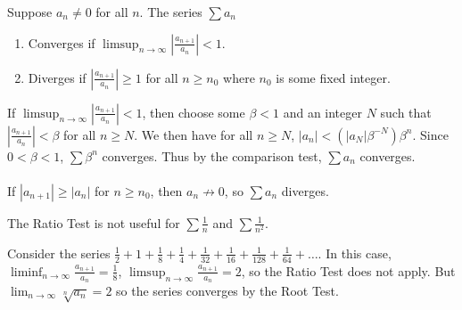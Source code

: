 \documentclass{jacky}
\begin{document}
\begin{thm}
  Suppose $a_n\neq0$ for all $n$. The series $\sum a_n$
  \begin{enumerate}
    \item Converges if $\limsup_{n\to\infty}|\frac{a_{n+1}}{a_n}|<1$.
    \item Diverges if $|\frac{a_{n+1}}{a_n}|\ge1$ for all $n\ge n_0$ where
      $n_0$ is some fixed integer.
  \end{enumerate}
\end{thm}

\begin{pf}
  If $\limsup_{n\to\infty}|\frac{a_{n+1}}{a_n}|<1$, then choose some $\beta<1$
  and an integer $N$ such that $|\frac{a_{n+1}}{a_n}|<\beta$ for all $n\ge N$.
  We then have for all $n\ge N$, $|a_n|<(|a_N|\beta^{-N})\beta^n$. Since
  $0<\beta<1$, $\sum\beta^n$ converges. Thus by the comparison test, $\sum a_n$
  converges.\\\\
  If $|a_{n+1}|\ge|a_n|$ for $n\ge n_0$, then $a_n\not\to0$, so $\sum a_n$
  diverges.
\end{pf}

\begin{note}
  The Ratio Test is not useful for $\sum\frac{1}{n}$ and $\sum\frac{1}{n^2}$.
\end{note}

\begin{ex}
  Consider the series $\frac{1}{2}+1+\frac{1}{8}+\frac{1}{4}+\frac{1}{32}
  +\frac{1}{16}+\frac{1}{128}+\frac{1}{64}+\ldots$. In this case,
  $\liminf_{n\to\infty}\frac{a_{n+1}}{a_n}=\frac{1}{8}$,
  $\limsup_{n\to\infty}\frac{a_{n+1}}{a_n}=2$, so the Ratio Test does not
  apply. But $\lim_{n\to\infty}\sqrt[n]{a_n}=2$ so the series converges by the
  Root Test.
\end{ex}
\end{document}
